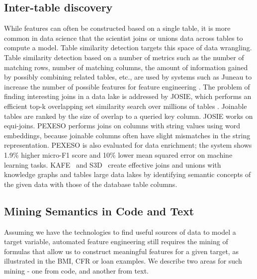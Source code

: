 \documentclass[sigconf]{acmart}
\begin{document}

\subsection{Inter-table discovery}
While features can often be constructed based on a single table, it is more common in data science that the scientist joins or unions data across tables to compute a model.  Table similarity detection targets this space of data wrangling.  Table similarity detection based on a number of metrics such as the number of matching rows, number of matching columns, the amount of information gained by possibly combining related tables, etc., are used by systems such as Juneau to increase the number of possible features for feature engineering \cite{10.1145/3318464.3389726}.  The problem of finding interesting joins in a data lake is addressed by JOSIE, which performs an efficient top-k overlapping set similarity search over millions of tables \cite{10.1145/3299869.3300065}.  Joinable tables are ranked by the size of overlap to a queried key column.  JOSIE works on equi-joins.  PEXESO \cite{Dong2021EfficientJT} performs joins on columns with string values using word embeddings, because joinable columns often have slight mismatches in the string representation.  PEXESO is also evaluated for data enrichment; the system shows 1.9\% higher micro-F1 score and 10\% lower mean squared error on machine learning tasks. KAFE~\cite{galhotra2019automated} and S3D~\cite{s3d} create effective joins and unions with knowledge graphs and tables large data lakes by identifying semantic concepts of the given data with those of the database table columns.

\subsection{Mining Semantics in Code and Text}
Assuming we have the technologies to find useful sources of data to model a target variable, automated feature engineering still requires the mining of formulas that allow us to construct meaningful features for a given target, as illustrated in the BMI, CFR or loan examples.  We describe two areas for such mining - one from code, and another from text.
\end{document}
